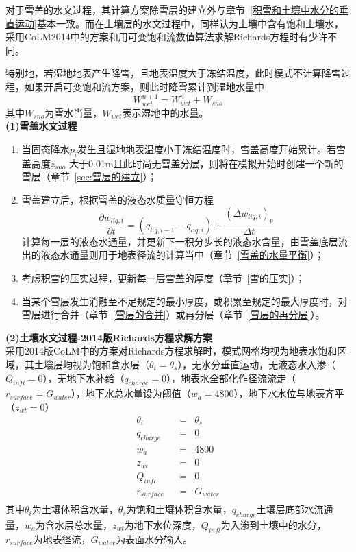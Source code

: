 对于雪盖的水文过程，其计算方案除雪层的建立外与章节~\ref{积雪和土壤中水分的垂直运动}基本一致。而在土壤层的水文过程中，同样认为土壤中含有饱和土壤水，采用CoLM2014中的方案和用可变饱和流数值算法求解Richards方程时有少许不同。

特别地，若湿地地表产生降雪，且地表温度大于冻结温度，此时模式不计算降雪过程，如果开启可变饱和流方案，则此时降雪累计到湿地水量中
\begin{equation}
W_{wet}^{n+1}=W_{wet}^{n}+W_{sno}
\end{equation}
其中$W_{sno}$为雪水当量，$W_{wet}$表示湿地中的水量。\\

\textbf {(1)雪盖水文过程}\\

\begin{enumerate}
    \item 当固态降水$p_i$发生且湿地地表温度小于冻结温度时，雪盖高度开始累计。若雪盖高度$z_{sno}$ 大于0.01m且此时尚无雪盖分层，则将在模拟开始时创建一个新的雪层（章节~\ref{sec:雪层的建立}）；
    \item 雪盖建立后，根据雪盖的液态水质量守恒方程
    \begin{equation}
            \frac{\partial w_{liq,i}}{\partial t}=\left(q_{liq,i-1}-q_{liq,i}\right)+\frac{{\left(\Delta w_{liq,i}\right)}_p}{\Delta t}
    \end{equation}
    计算每一层的液态水通量，并更新下一积分步长的液态水含量，由雪盖底层流出的液态水通量则用于地表径流的计算当中（章节~\ref{雪盖的水量平衡}）；
    \item 考虑积雪的压实过程，更新每一层雪盖的厚度（章节~\ref{雪的压实}）；
    \item 当某个雪层发生消融至不足规定的最小厚度，或积累至规定的最大厚度时，对雪层进行合并（章节~\ref{雪层的合并}）或再分层（章节~\ref{雪层的再分层}）。
\end{enumerate}

\textbf {(2)土壤水文过程-2014版Richards方程求解方案}\\

采用2014版CoLM中的方案对Richards方程求解时，模式网格均视为地表水饱和区域，其土壤层均视为饱和含水层（$\theta_{i}=\theta_{s}$），无水分垂直运动，无液态水入渗（$Q_{infl}=0$），无地下水补给（$q_{charge}=0$），地表水全部化作径流流走（$r_{surface}=G_{water}$），地下水总水量设为阈值（$w_a=4800$），地下水水位与地表齐平（$z_{wt}=0$）
\begin{equation}
\begin{aligned}
    &\theta_{i} &&= &\theta_{s}& \\
    &q_{charge} &&=&0 &\\
    &w_a &&=&4800& \\
    &z_{wt} &&=&0& \\
    &Q_{infl} &&=&0& \\
    &r_{surface} &&=&G_{water}& \\
\end{aligned}
\end{equation}
其中$\theta_{i}$为土壤体积含水量，$\theta_{s}$为饱和土壤体积含水量，$q_{charge}$土壤层底部水流通量，$w_{a}$为含水层总水量，$z_{wt}$为地下水位深度，$Q_{infl}$为入渗到土壤中的水分，$r_{surface}$为地表径流，$G_{water}$为表面水分输入。\\

